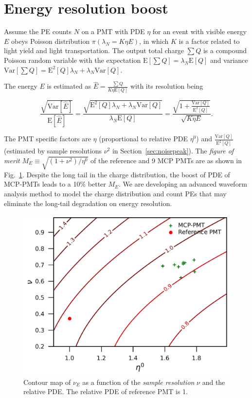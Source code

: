 \section{Energy resolution boost}
\label{Result}
Assume the PE counts $N$ on a PMT with PDE $\eta$ for an event with visible energy $E$ obeys Poisson distribution $\pi(\lambda_N=K\eta E)$, in which $K$ is a factor related to light yield and light transportation. The output total charge $\sum{Q}$ is a compound Poisson random variable with the expectation $\mathrm{E}[\sum{Q}]=\lambda_N\mathrm{E}[Q]$ and variance $\mathrm{Var}[\sum{Q}]=\mathrm{E}^2[Q]\lambda_N+\lambda_N\mathrm{Var}[Q]$.

The energy $E$ is estimated as $\hat{E}=\frac{\sum{Q}}{K\eta\mathrm{E}[Q]}$ with its resolution being

\begin{equation}
    \frac{\sqrt{\mathrm{Var}[\hat{E}]}}{\mathrm{E}[\hat{E}]}=\frac{\sqrt{\mathrm{E}^2[Q]\lambda_N+\lambda_N\mathrm{Var}[Q]}}{\lambda_N\mathrm{E}[Q]}=\frac{\sqrt{1+\frac{\mathrm{Var}[Q]}{\mathrm{E}^2[Q]}}}{\sqrt{K\eta E}}.
\end{equation}

The PMT specific factors are $\eta$ (proportional to relative PDE $\eta^0$) and $\frac{\mathrm{Var}[Q]}{\mathrm{E}^2[Q]}$ (estimated by sample resolutions $\nu^2$ in Section~\ref{sec:noisepeak}). The \emph{figure of merit} $M_{E}\equiv\sqrt{({1+\nu^2})/{\eta^0}}$ of the reference and 9 MCP PMTs are as shown in Fig.~\ref{fig:EnergyResolution}. Despite the long tail in the charge distribution, the boost of PDE of MCP-PMTs leads to a 10\% better $M_{E}$. We are developing an advanced waveform analysis method to model the charge distribution and count PEs that may eliminate the long-tail degradation on energy resolution.
\begin{figure}[!htbp]
    \centering
    \includegraphics[width=\MF\textwidth]{figures/result/resolution.pdf}
    \caption{Contour map of $\nu_{E}$ as a function of the \emph{sample resolution} $\nu$ and the relative PDE. The relative PDE of reference PMT is 1.}
    \label{fig:EnergyResolution}
\end{figure}
